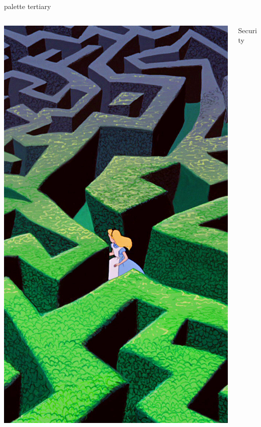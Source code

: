\documentclass[aspectratio=169]{beamer}
\begin{document}

\begin{frame}[plain]
  \begin{beamercolorbox}[sep=0.1px,center,wd=\paperwidth,ht=\paperheight]{palette tertiary}
    \begin{columns}
      \begin{column}{0.3\textwidth}
        \includegraphics[height=\paperheight]{labyrinth}
      \end{column}
      \begin{column}{0.7\textwidth}
        \Huge\centering Security
      \end{column}
    \end{columns}
  \end{beamercolorbox}
\end{frame}
\end{document}
